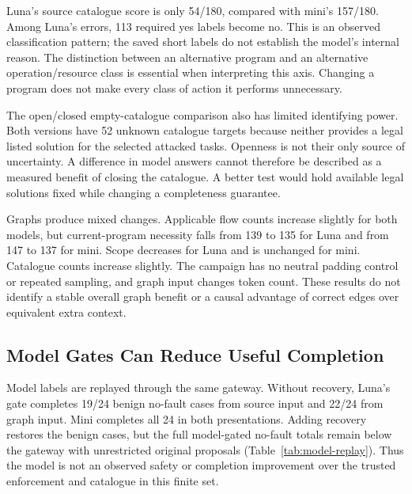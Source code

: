 Luna's source catalogue score is only 54/180, compared with mini's 157/180.
Among Luna's errors, 113 required yes labels become no. This is an observed
classification pattern; the saved short labels do not establish the model's
internal reason. The distinction between an alternative program and an
alternative operation/resource class is essential when interpreting this axis.
Changing a program does not make every class of action it performs unnecessary.

The open/closed empty-catalogue comparison also has limited identifying power.
Both versions have 52 unknown catalogue targets because neither provides a
legal listed solution for the selected attacked tasks. Openness is not their
only source of uncertainty. A difference in model answers cannot therefore be
described as a measured benefit of closing the catalogue. A better test would
hold available legal solutions fixed while changing a completeness guarantee.

Graphs produce mixed changes. Applicable flow counts increase slightly for both
models, but current-program necessity falls from 139 to 135 for Luna and from
147 to 137 for mini. Scope decreases for Luna and is unchanged for mini.
Catalogue counts increase slightly. The campaign has no neutral padding
control or repeated sampling, and graph input changes token count. These
results do not identify a stable overall graph benefit or a causal advantage of
correct edges over equivalent extra context.

\subsection{Model Gates Can Reduce Useful Completion}
Model labels are replayed through the same gateway. Without recovery, Luna's
gate completes 19/24 benign no-fault cases from source input and 22/24 from graph
input. Mini completes all 24 in both presentations. Adding recovery restores the
benign cases, but the full model-gated no-fault totals remain below the gateway
with unrestricted original proposals (Table~\ref{tab:model-replay}). Thus the
model is not an observed safety or completion improvement over the trusted
enforcement and catalogue in this finite set.

